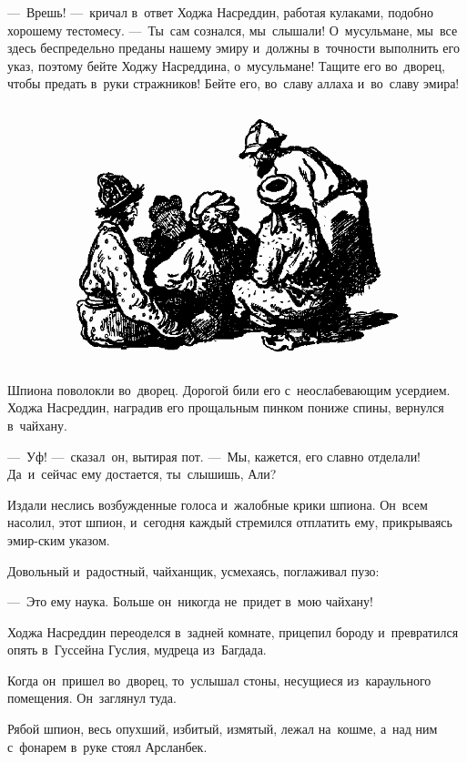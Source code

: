 \documentclass[12pt,a4paper]{book}
\begin{document}
—~Врешь! —~кричал в~ответ Ходжа Насреддин, работая кулаками, подобно хорошему тестомесу. —~Ты~сам сознался, мы~слышали! О~мусульмане, мы~все здесь беспредельно преданы нашему эмиру и~должны в~точности выполнить его указ, поэтому бейте Ходжу Насреддина, о~мусульмане! Тащите его во~дворец, чтобы предать в~руки стражников! Бейте его, во~славу аллаха и~во~славу эмира!

\begin{figure}[h]
\centering
\includegraphics[width=\textwidth]{16.png}
\end{figure}

Шпиона поволокли во~дворец. Дорогой били его с~неослабевающим усердием. Ходжа Насреддин, наградив его прощальным пинком пониже спины, вернулся в~чайхану.

—~Уф! —~сказал~он, вытирая пот. —~Мы, кажется, его славно отделали! Да~и~сейчас ему достается, ты~слышишь, Али?

Издали неслись возбужденные голоса и~жалобные крики шпиона. Он~всем насолил, этот шпион, и~сегодня каждый стремился отплатить ему, прикрываясь эмир-ским указом.

Довольный и~радостный, чайханщик, усмехаясь, поглаживал пузо:

—~Это ему наука. Больше он~никогда не~придет в~мою чайхану!

Ходжа Насреддин переоделся в~задней комнате, прицепил бороду и~превратился опять в~Гуссейна Гуслия, мудреца из~Багдада.

Когда он~пришел во~дворец, то~услышал стоны, несущиеся из~караульного помещения. Он~заглянул туда.

Рябой шпион, весь опухший, избитый, измятый, лежал на~кошме, а~над ним с~фонарем в~руке стоял Арсланбек.
\end{document}
